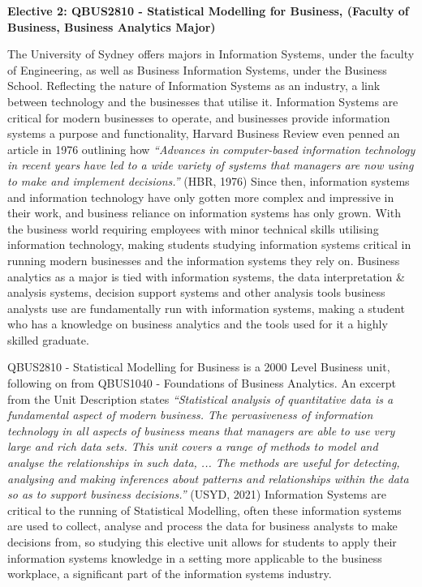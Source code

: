 \textbf{Elective 2: QBUS2810 - Statistical Modelling for Business, (Faculty of Business, Business Analytics Major)}

The University of Sydney offers majors in Information Systems, under the faculty of Engineering, as well as Business Information Systems, under the Business School. Reflecting the nature of Information Systems as an industry, a link between technology and the businesses that utilise it. Information Systems are critical for modern businesses to operate, and businesses provide information systems a purpose and functionality, Harvard Business Review even penned an article in 1976 outlining how \textit{“Advances in computer-based information technology in recent years have led to a wide variety of systems that managers are now using to make and implement decisions.”} (HBR, 1976)  Since then, information systems and information technology have only gotten more complex and impressive in their work, and business reliance on information systems has only grown. With the business world requiring employees with minor technical skills utilising information technology, making students studying information systems critical in running modern businesses and the information systems they rely on.  Business analytics as a major is tied with information systems, the data interpretation & analysis systems, decision support systems and other analysis tools business analysts use are fundamentally run with information systems, making a student who has a knowledge on business analytics and the tools used for it a highly skilled graduate.

QBUS2810 - Statistical Modelling for Business is a 2000 Level Business unit, following on from QBUS1040 - Foundations of Business Analytics. An excerpt from the Unit Description states \textit{“Statistical analysis of quantitative data is a fundamental aspect of modern business. The pervasiveness of information technology in all aspects of business means that managers are able to use very large and rich data sets. This unit covers a range of methods to model and analyse the relationships in such data, ... The methods are useful for detecting, analysing and making inferences about patterns and relationships within the data so as to support business decisions.”} (USYD, 2021) Information Systems are critical to the running of Statistical Modelling, often these information systems are used to collect, analyse and process the data for business analysts to make decisions from, so studying this elective unit allows for students to apply their information systems knowledge in a setting more applicable to the business workplace, a significant part of the information systems industry. 

